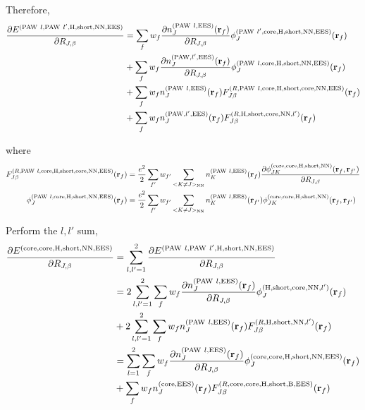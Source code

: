 \documentclass[paper=a4, fontsize=11pt]{article} %
\numberwithin{equation}{section} %
\numberwithin{figure}{section} %
\numberwithin{table}{section} %
\newcommand{\p}{\partial}
\newcommand{\br}{{\bf{r}}}
\newcommand{\rEES}{{\mathrm{EES}}}
\newcommand{\rcore}{{\mathrm{core}}}
\newcommand{\rNN}{{\mathrm{NN}}}
\newcommand{\rshort}{{\mathrm{short}}}
\newcommand{\rP}{{\mathrm{PAW}}}
\newcommand{\rH}{{\mathrm{H}}}
\newcommand{\rB}{{\mathrm{B}}}
\newcommand{\RJb}{{R_{J,\beta}}}
\begin{document}
Therefore,
\begin{equation}
\begin{split}
\frac{\p E^{(\rP\ l,\rP\ l',\rH,\rshort,\rNN,\rEES)}}{\p \RJb}
&= \sum_{f} w_f \frac{\p n_{J}^{(\rP\ l,\rEES)}(\br_f)}{\p \RJb} \phi_J^{(\rP\ l',\rcore,\rH,\rshort,\rNN,\rEES)}(\br_f)\\
&+ \sum_{f} w_f \frac{\p n_{J}^{(\rP,l',\rEES)}(\br_f)}{\p \RJb} \phi_J^{(\rP\ l,\rcore,\rH,\rshort,\rNN,\rEES)}(\br_f)\\
&+ \sum_{f} w_f n_{J}^{(\rP\ l,\rEES)}(\br_f) F_{J\beta}^{(R,\rP\ l,\rcore,\rH,\rshort,\rcore,\rNN,\rEES)}(\br_f)\\
&+ \sum_{f} w_f n_{J}^{(\rP,l',\rEES)}(\br_f) F_{J\beta}^{(R,\rH,\rshort,\rcore,\rNN,l')}(\br_f) \\
\end{split}
\end{equation}

where
\begin{equation}
\begin{split}
F_{J\beta}^{(R,\rP\ l,\rcore,\rH,\rshort,\rcore,\rNN,\rEES)}(\br_f)&=\frac{e^2}{2}\sum_{f'}w_{f'}\sum_{<K \neq J>_\rNN}n_{K}^{(\rP\ l,\rEES)}(\br_f) \frac{\p \phi_{JK}^{(\rcore,\rcore,\rH,\rshort,\rNN)}(\br_f,\br_{f'})}{\p \RJb}\\
\phi_J^{(\rP\ l,\rcore,\rH,\rshort,\rNN,\rEES)}(\br_f)&= \frac{e^2}{2}\sum_{f'} w_{f'}\sum_{<K \neq J>_\rNN} n_K^{(\rP\ l,\rEES)}(\br_{f'}) \phi_{JK}^{(\rcore,\rcore,\rH,\rshort,\rNN)}(\br_f,\br_{f'})\\
\end{split}
\end{equation}

Perform the $l,l'$ sum,
\begin{equation}\label{eq:dHccNNdR}
\begin{split}
\frac{\p E^{(\rcore,\rcore,\rH,\rshort,\rNN,\rEES)}}{\p \RJb}
&=\sum_{l,l'=1}^2\frac{\p E^{(\rP\ l,\rP\ l',\rH,\rshort,\rNN,\rEES)}}{\p \RJb}\\
&= 2\sum_{l,l'=1}^2\sum_{f} w_f \frac{\p n_{J}^{(\rP\ l,\rEES)}(\br_f)}{\p \RJb} \phi_J^{(\rH,\rshort,\rcore,\rNN,l')}(\br_f)\\
&+ 2\sum_{l,l'=1}^2\sum_{f} w_f n_{J}^{(\rP\ l,\rEES)}(\br_f) F_{J\beta}^{(R,\rH,\rshort,\rNN,l')}(\br_f) \\
&= \sum_{l=1}^2\sum_{f} w_f \frac{\p n_{J}^{(\rP\ l,\rEES)}(\br_f)}{\p \RJb} \phi_J^{(\rcore,\rcore,\rH,\rshort,\rNN,\rEES)}(\br_f)\\
&+ \sum_{f} w_f n_{J}^{(\rcore,\rEES)}(\br_f) F_{J\beta}^{(R,\rcore,\rcore,\rH,\rshort,\rB,\rEES)}(\br_f)
\end{split}
\end{equation}
\end{document}
